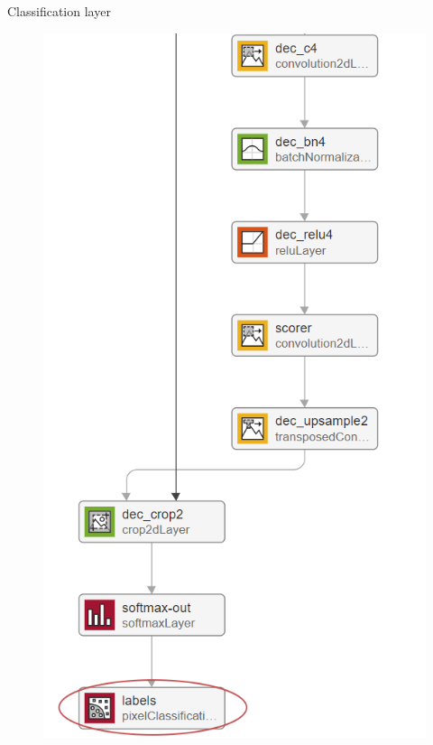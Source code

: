 \documentclass[aspectratio=169,xcolor=dvipsnames]{beamer}
\begin{document}
\begin{frame}[fragile]{Classification layer}
\begin{figure}
\begin{minipage}{0.7\linewidth}
\begin{minipage}{0.4\linewidth}
\end{minipage}
	\end{minipage}\hfill
\begin{minipage}{0.3\linewidth}\centering
\includegraphics[width=0.9\linewidth]{lastlayers.png}
\end{minipage}
	
\end{figure}
\end{frame}
\end{document}
